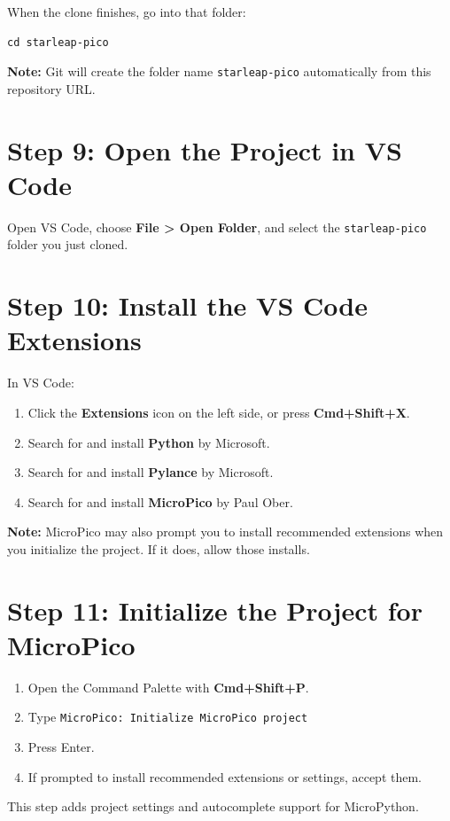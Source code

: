 \documentclass[11pt,letterpaper]{article}
\begin{document}
When the clone finishes, go into that folder:

\begin{verbatim}
cd starleap-pico
\end{verbatim}

\textbf{Note:} Git will create the folder name \texttt{starleap-pico} automatically from this repository URL.

\section*{Step 9: Open the Project in VS Code}
Open VS Code, choose \textbf{File > Open Folder}, and select the \texttt{starleap-pico} folder you just cloned.

\section*{Step 10: Install the VS Code Extensions}
In VS Code:
\begin{enumerate}
    \item Click the \textbf{Extensions} icon on the left side, or press \textbf{Cmd+Shift+X}.
    \item Search for and install \textbf{Python} by Microsoft.
    \item Search for and install \textbf{Pylance} by Microsoft.
    \item Search for and install \textbf{MicroPico} by Paul Ober.
\end{enumerate}

\textbf{Note:} MicroPico may also prompt you to install recommended extensions when you initialize the project. If it does, allow those installs.

\section*{Step 11: Initialize the Project for MicroPico}
\begin{enumerate}
    \item Open the Command Palette with \textbf{Cmd+Shift+P}.
    \item Type \texttt{MicroPico: Initialize MicroPico project}
    \item Press Enter.
    \item If prompted to install recommended extensions or settings, accept them.
\end{enumerate}

This step adds project settings and autocomplete support for MicroPython.
\end{document}
